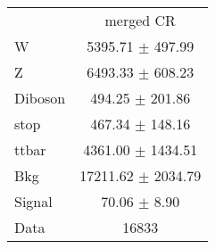 \begin{tabular}{l|c|}
\cline{2-2}
 & \multicolumn{1}{c|}{merged CR}\\
W & 5395.71 $\pm$ 497.99\\
Z & 6493.33 $\pm$ 608.23\\
Diboson & 494.25 $\pm$ 201.86\\
stop & 467.34 $\pm$ 148.16\\
ttbar & 4361.00 $\pm$ 1434.51\\
\hline
Bkg & 17211.62 $\pm$ 2034.79\\
\hline
Signal & 70.06 $\pm$ 8.90\\
\hline
Data & 16833 \\
\end{tabular}
